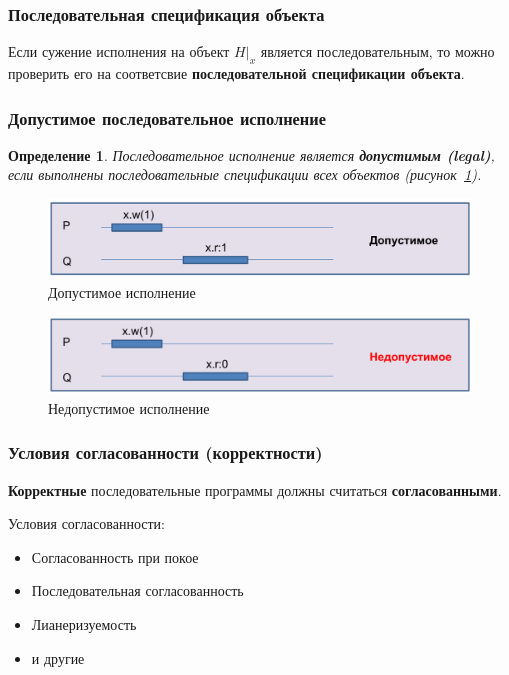 \documentclass[10pt,a4paper,oneside,titlepage]{article}
\theoremstyle{plain}
\theoremstyle{defenition}
\newtheorem*{defenition}{Определение}
\begin{document}
\subsubsection{Последовательная спецификация объекта}
Если сужение исполнения на объект $H|_x$ является последовательным, то можно проверить его на соответсвие {\bfseries последовательной спецификации объекта}.

\subsubsection{Допустимое последовательное исполнение}
\begin{defenition}
	Последовательное исполнение является {\bfseries допустимым (legal)}, если выполнены последовательные спецификации всех объектов (рисунок~\ref{fig:model7}).
\end{defenition}

\begin{figure}[h!]
	\centering
	\includegraphics[width=0.5\linewidth]{pictures/Model7}
	\caption{Допустимое исполнение}
	\label{fig:model7}
\end{figure}

\begin{figure}[h!]
	\centering
	\includegraphics[width=0.5\linewidth]{pictures/Model8}
	\caption{Недопустимое исполнение}
	\label{fig:model8}
\end{figure}

\subsubsection{Условия согласованности (корректности)}
{\bfseries Корректные} последовательные программы должны считаться {\bfseries согласованными}.

Условия согласованности:
\begin{itemize}
	\item Согласованность при покое
	\item Последовательная согласованность
	\item Лианеризуемость
	\item и другие
\end{itemize}
\end{document}
